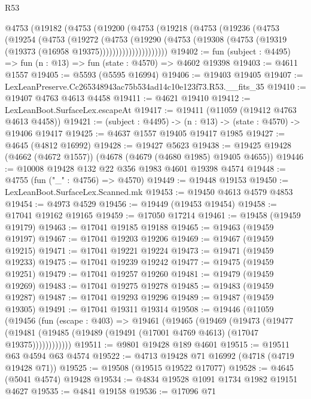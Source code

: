 \begin{lexlean}{R53}
\begin{coremodule}
      @4753
        (@19182
          (@4753
            (@19200
              (@4753
                (@19218
                  (@4753
                    (@19236
                      (@4753
                        (@19254
                          (@4753
                            (@19272
                              (@4753
                                (@19290
                                  (@4753
                                    (@19308
                                      (@4753 (@19319 (@19373 (@16958 @19375)))))))))))))))))))))
@19402 := fun (subject : @4495) => fun (n : @13) => fun (state : @4570) => @4602 @19398
@19403 := @4611 @1557
@19405 := @5593 (@5595 @16994)
@19406 := @19403 @19405
@19407 := LexLeanPreserve.Cc265348943ac75b534ad14c10e123f73.R53.__fits_35
@19410 := @19407 @4763 @4613 @4458
@19411 := @4621 @19410
@19412 := LexLeanBoot.SurfaceLex.escapeAt
@19417 := @19411 (@11059 (@19412 @4763 @4613 @4458))
@19421 := (subject : @4495) -> (n : @13) -> (state : @4570) -> @19406 @19417
@19425 := @4637 @1557 @19405 @19417 @1985
@19427 := @4645 (@4812 @16992)
@19428 := @19427 @5623
@19438 := @19425 @19428 (@4662 (@4672 @1557)) (@4678 (@4679 (@4680 @1985) @19405 @4655))
@19446 := @10008 @19428 @132 @22 @356 @1983 @4601 @19398 @4574
@19448 := @4755 (fun ("_" : @4756) => @4570)
@19449 := @19448 @19153
@19450 := LexLeanBoot.SurfaceLex.Scanned.mk
@19453 := @19450 @4613 @4579 @4853
@19454 := @4973 @4529
@19456 := @19449 (@19453 @19454)
@19458 := @17041 @19162 @19165
@19459 := @17050 @17214
@19461 := @19458 (@19459 @19179)
@19463 := @17041 @19185 @19188
@19465 := @19463 (@19459 @19197)
@19467 := @17041 @19203 @19206
@19469 := @19467 (@19459 @19215)
@19471 := @17041 @19221 @19224
@19473 := @19471 (@19459 @19233)
@19475 := @17041 @19239 @19242
@19477 := @19475 (@19459 @19251)
@19479 := @17041 @19257 @19260
@19481 := @19479 (@19459 @19269)
@19483 := @17041 @19275 @19278
@19485 := @19483 (@19459 @19287)
@19487 := @17041 @19293 @19296
@19489 := @19487 (@19459 @19305)
@19491 := @17041 @19311 @19314
@19508 := @19446
    (@11059
      (@19456
        (fun (escape : @403) =>
        @19461
          (@19465
            (@19469
              (@19473
                (@19477
                  (@19481 (@19485 (@19489 (@19491 (@17001 @4769 @4613) (@17047 @19375))))))))))))
@19511 := @9801 @19428 @189 @4601
@19515 := @19511 @63 @4594 @63 @4574
@19522 := @4713 @19428 @71 @16992 (@4718 (@4719 @19428 @71))
@19525 := @19508 (@19515 @19522 @17077)
@19528 := @4645 (@5041 @4574) @19428
@19534 := @4834 @19528 @1091 @1734 @1982 @19151 @4627
@19535 := @4841 @19158
@19536 := @17096 @71

\end{coremodule}
\end{lexlean}
